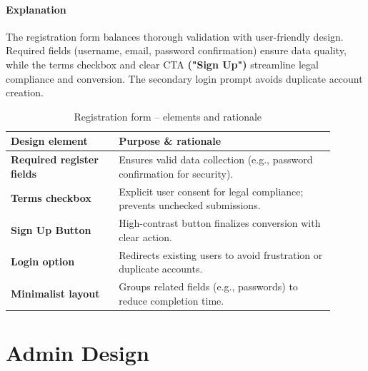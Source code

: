 \documentclass[12pt]{article}
\begin{document}
	\paragraph{Explanation}%
	The registration form balances thorough validation with user-friendly design.
	Required fields (username, email, password confirmation) ensure data quality, while the terms checkbox and clear CTA \textbf{("Sign Up")} streamline legal compliance and conversion.
	The secondary login prompt avoids duplicate account creation.

	\begin{table}[H]
		\centering
		\caption{Registration form – elements and rationale}
		\label{tab:register-elements}
		\begin{tabular}{p{0.30\linewidth} p{0.60\linewidth}}
			\hline
			\textbf{Design element} & \textbf{Purpose \& rationale} \\ 	\hline
			\textbf{Required register fields}   & Ensures valid data collection (e.g., password confirmation for security). \\
			\textbf{Terms checkbox}          	& Explicit user consent for legal compliance; prevents unchecked submissions. \\
			\textbf{Sign Up Button}      	    & High-contrast button finalizes conversion with clear action. \\
			\textbf{Login option}            	& Redirects existing users to avoid frustration or duplicate accounts. \\
			\textbf{Minimalist layout}       	& Groups related fields (e.g., passwords) to reduce completion time. \\
			\hline
		\end{tabular}
	\end{table}

	
	\section{Admin Design}\label{sec:admin-design}
	\vspace{0.3cm}
	
	
\end{document}
